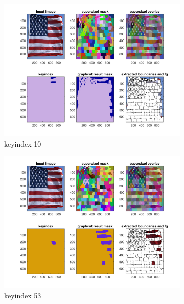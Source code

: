\begin{figure}[htbp]
	\centering
    \begin{subfigure}[t]{0.49\textwidth}
        \centering
        \includegraphics[width=\textwidth]{hw5/flag5.png}
		\caption{keyindex 10}\label{fig:22a}
    \end{subfigure}
    \begin{subfigure}[t]{0.49\textwidth}
        \centering
        \includegraphics[width=\textwidth]{hw5/flag4.png}
		\caption{keyindex 53}\label{fig:22b}
    \end{subfigure}
    \begin{subfigure}[t]{0.49\textwidth}
        \centering

\end{subfigure}
\end{figure}
